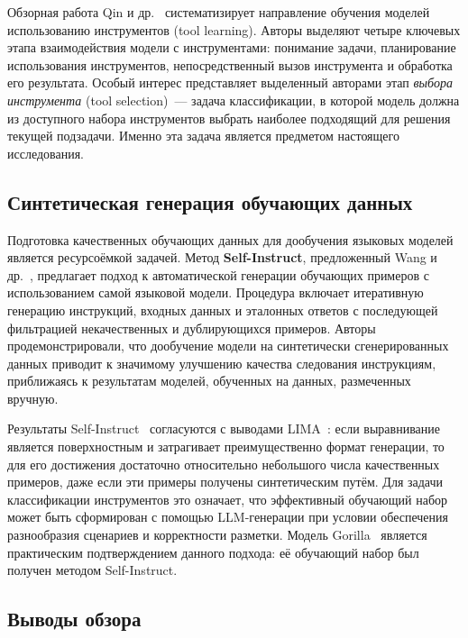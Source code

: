 Обзорная работа Qin и др.~\cite{qin2024toollearning} систематизирует направление обучения моделей использованию инструментов (tool learning). Авторы выделяют четыре ключевых этапа взаимодействия модели с инструментами: понимание задачи, планирование использования инструментов, непосредственный вызов инструмента и обработка его результата. Особый интерес представляет выделенный авторами этап \textit{выбора инструмента} (tool selection)~--- задача классификации, в которой модель должна из доступного набора инструментов выбрать наиболее подходящий для решения текущей подзадачи. Именно эта задача является предметом настоящего исследования.

\subsection{Синтетическая генерация обучающих данных}

Подготовка качественных обучающих данных для дообучения языковых моделей является ресурсоёмкой задачей. Метод \textbf{Self-Instruct}, предложенный Wang и др.~\cite{wang2023selfinstruct}, предлагает подход к автоматической генерации обучающих примеров с использованием самой языковой модели. Процедура включает итеративную генерацию инструкций, входных данных и эталонных ответов с последующей фильтрацией некачественных и дублирующихся примеров. Авторы продемонстрировали, что дообучение модели на синтетически сгенерированных данных приводит к значимому улучшению качества следования инструкциям, приближаясь к результатам моделей, обученных на данных, размеченных вручную.

Результаты Self-Instruct~\cite{wang2023selfinstruct} согласуются с выводами LIMA~\cite{zhou2023lima}: если выравнивание является поверхностным и затрагивает преимущественно формат генерации, то для его достижения достаточно относительно небольшого числа качественных примеров, даже если эти примеры получены синтетическим путём. Для задачи классификации инструментов это означает, что эффективный обучающий набор может быть сформирован с помощью LLM-генерации при условии обеспечения разнообразия сценариев и корректности разметки. Модель Gorilla~\cite{patil2023gorilla} является практическим подтверждением данного подхода: её обучающий набор был получен методом Self-Instruct.

\subsection{Выводы обзора}

